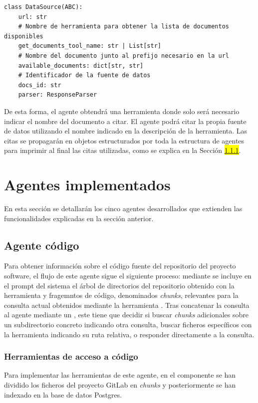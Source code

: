 \begin{lstlisting}[caption={\protect\opus{DataSource}: clase destinada a almacenar los documentos citables para una fuente de datos}, label={lst:data_src}]
class DataSource(ABC):
    url: str
    # Nombre de herramienta para obtener la lista de documentos disponibles
    get_documents_tool_name: str | List[str]
    # Nombre del documento junto al prefijo necesario en la url
    available_documents: dict[str, str]
    # Identificador de la fuente de datos
    docs_id: str
    parser: ResponseParser
\end{lstlisting}

De esta forma, el agente obtendrá una herramienta donde solo será necesario indicar el nombre del documento a citar. El agente podrá citar la propia fuente de datos utilizando el nombre indicado en la descripción de la herramienta. Las citas se propagarán en objetos estructurados por toda la estructura de agentes para imprimir al final las citas utilizadas, como se explica en la Sección \colorbox{yellow}{\ref{}}. 


\section{Agentes implementados}
En esta sección se detallarán los cinco agentes desarrollados que extienden las funcionalidades explicadas en la sección anterior.

\subsection{Agente código}
Para obtener información sobre el código fuente del repositorio del proyecto software, el flujo de este agente sigue el siguiente proceso: mediante  se incluye en el prompt del sistema el árbol de directorios del repositorio obtenido con la herramienta  y fragemntos de código, denominados \textit{chunks}, relevantes para la consulta actual obtenidos mediante la herramienta . Tras concatenar la consulta al agente mediante un , este tiene que decidir si buscar \textit{chunks} adicionales sobre un subdirectorio concreto indicando otra consulta, buscar ficheros específicos con la herramienta  indicando su ruta relativa, o responder directamente a la consulta. 

\subsubsection{Herramientas de acceso a código}
Para implementar las herramientas de este agente, en el componente  se han dividido los ficheros del proyecto GitLab en \textit{chunks} y posteriormente se han indexado en la base de datos Postgres.

